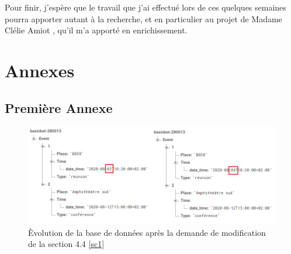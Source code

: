 \documentclass[stage2a]{tnreport} %
\begin{document}
Pour finir, j'espère que le travail que j'ai effectué lors de ces quelques semaines pourra apporter autant à la recherche, et en particulier au projet de Madame Clélie Amiot , qu'il m'a apporté en enrichissement. 

\cleardoublepage
\renewcommand{\tocbibname}{Bibliographie / Webographie}


\cleardoublepage

\listoffigures
\cleardoublepage

\appendix
\part*{Annexes}
\cleardoublepage

\chapter{Première Annexe}
\begin{figure}[H]
    \centering
    \includegraphics[width=\textwidth]{figures/db1.png}
    \caption{\`{E}volution de la base de données après la demande de modification de la section 4.4 \ref{sc1}}
    \label{db1}
\end{figure}
\end{document}
